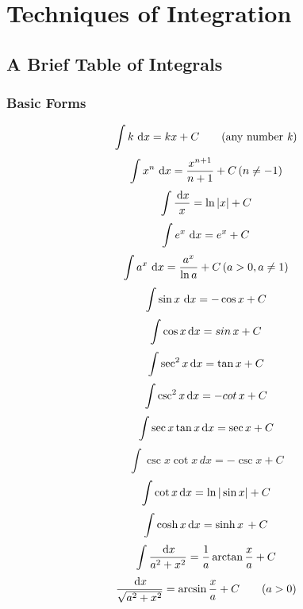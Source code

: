 \chapter{Techniques of Integration}

\section{A Brief Table of Integrals}

\subsection{Basic Forms}

\begin{equation}
  \int k\,\,\mathrm{d} x=kx+C \qquad \text{(any number \emph{k})}
\end{equation}
\begin{equation}
  \int x^n \, \,\mathrm{d} x = \frac {x^{n+1}}{n+1}+C\,(n \neq -1)
\end{equation}
\begin{equation}
  \int \frac{\,\mathrm{d} x}{x}=\ln{|x|}+C
\end{equation}
\begin{equation}
  \int e^x\, \,\mathrm{d} x=e^x+C
\end{equation}
\begin{equation}
  \int a^x\, \,\mathrm{d} x=\frac{a^x}{\ln a}+C \,(a>0,a\neq 1)
\end{equation}
\begin{equation}
  \int \sin x \, \,\mathrm{d} x=-\cos x +C
\end{equation}
\begin{equation}
  \int \cos x \,\mathrm{d} x=sin\,x+C
\end{equation}
\begin{equation}
  \int \sec^2x \,\mathrm{d} x = \tan x + C
\end{equation}
\begin{equation}
  \int \csc^2 x \,\mathrm{d} x = -cot\,x +C
\end{equation}
\begin{equation}
  \int \sec x \tan x \,\mathrm{d} x = \sec x +C
\end{equation}
\begin{equation}
  \int \csc x \cot x \,dx = -\csc x +C
\end{equation}
\begin{equation}
  \int \cot x \,\mathrm{d} x=\ln{|\sin x|}+C
\end{equation}
\begin{equation}
  \int \cosh x \,\mathrm{d} x=\sinh x\,+C
\end{equation}
\begin{equation}
  \int \frac{\,\mathrm{d} x}{a^2+x^2}=\frac{1}{a}\arctan{\frac{x}{a}}+C
\end{equation}
\begin{equation}
  \frac{\,\mathrm{d} x}{\sqrt{a^2+x^2}}=\arcsin{\frac{x}{a}+C} \qquad (a > 0)
\end{equation}


